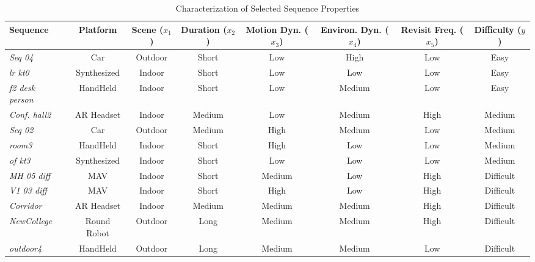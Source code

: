 \begin{table*}[t]
\centering
\caption{Characterization of Selected Sequence Properties}
\begin{tabular}{l|c|c|c|c|c|c|c}
\toprule
\midrule
\textbf{Sequence} & \textbf{Platform} & \textbf{Scene ($x_1$)} & \textbf{Duration ($x_2$)} & \textbf{Motion Dyn. ($x_3$)} & \textbf{Environ. Dyn. ($x_4$)} & \textbf{Revisit Freq. ($x_5$)} & \textbf{Difficulty ($y$)} \\
\midrule[0.1pt]
\textit{Seq 04}~\cite{KITTI} & Car & Outdoor & Short & Low & High & Low & Easy \\
\midrule[0.1pt]
\textit{lr kt0}~\cite{ICLNUIM} & Synthesized & Indoor & Short & Low & Low & Low & Easy \\
\midrule[0.1pt]
\textit{f2 desk person}~\cite{sturm12iros_ws} & HandHeld & Indoor & Short & Low & Medium & Low & Easy \\
\midrule[0.1pt]


\textit{Conf. hall2} & AR Headset & Indoor & Medium & Low & Medium & High & Medium \\
\midrule[0.1pt]
\textit{Seq 02}~\cite{KITTI} & Car & Outdoor & Medium & High & Medium & Low & Medium \\
\midrule[0.1pt]
\textit{room3}~\cite{schubert2018vidataset} & HandHeld & Indoor & Short & High & Low & Low & Medium \\
\midrule[0.1pt]
\textit{of kt3}~\cite{ICLNUIM} & Synthesized & Indoor & Short & Low & Low & Low & Medium \\
\midrule[0.1pt]


\textit{MH 05 diff}~\cite{burri2016euroc} & MAV & Indoor & Short & Medium & Low & High & Difficult \\
\midrule[0.1pt]
\textit{V1 03 diff}~\cite{burri2016euroc} & MAV & Indoor & Short & High & Low & High & Difficult \\
\midrule[0.1pt]
\textit{Corridor} & AR Headset & Indoor & Medium & Medium & Medium & High & Difficult \\
\midrule[0.1pt]
\textit{NewCollege}~\cite{smith2009new} & Round Robot & Outdoor & Long & Medium & Medium & High & Difficult \\
\midrule[0.1pt]
\textit{outdoor4}~\cite{schubert2018vidataset} & HandHeld & Outdoor & Long & Medium & Medium & Low & Difficult \\
\midrule[0.1pt]
\bottomrule
\end{tabular} 
\label{tab:summ_vslam}
\end{table*}


